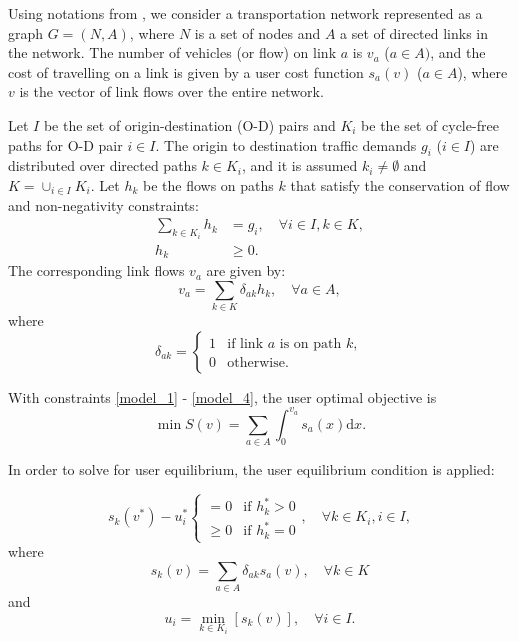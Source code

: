 
Using notations from \citet{Florian, Florian2008},
we consider a transportation network represented as a graph $G = (N, A)$,
where $N$ is a set of nodes and $A$ a set of directed links in the network.
The number of vehicles (or flow) on link $a$ is $v_a$ ($a \in A)$,
and the cost of travelling on a link is given by a user cost function $s_a(v)$ ($a \in A$),
where $v$ is the vector of link flows over the entire network.

Let $I$ be the set of origin-destination (O-D) pairs
and $K_i$ be the set of cycle-free paths for O-D pair $i \in I$.
The origin to destination traffic demands $g_i$ ($i \in I$) are distributed over directed paths $k \in K_i$,
and it is assumed $k_i \neq \emptyset$ and $K = \cup_{i \in I} K_i$.
Let $h_k$ be the flows on paths $k$ that satisfy the conservation of flow and non-negativity constraints:
\begin{align} \label{model_1}
    \sum_{k \in K_i} h_k & = g_i, \quad \forall i \in I, k \in K, \\
    h_k &\geq 0.
\end{align}
The corresponding link flows $v_a$ are given by:
\begin{equation}
    v_a = \sum_{k \in K} \delta_{ak} h_k, \quad \forall a \in A,
\end{equation}
where
\begin{equation} \label{model_4}
    \delta_{ak} = 
    \begin{cases}
        1 & \text{if link $a$ is on path $k$},\\
        0 & \text{otherwise}.
    \end{cases}
\end{equation}

With constraints \ref{model_1} - \ref{model_4},
the user optimal objective is
\begin{equation}
    \min S(v) = \sum_{a\in A} \int_0^{v_a} s_a(x) \mathrm{d} x.
\end{equation}

In order to solve for user equilibrium,
the \citep{Wardrop} user equilibrium condition is applied:

\begin{equation} \label{wardrop1}
    s_k(v^{\ast}) - u_i^{\ast} 
    \begin{cases}
        =0 & \text{if } h_k^{\ast} > 0 \\
        \geq 0 & \text{if } h_k^{\ast} = 0
    \end{cases}
    ,
    \quad \forall k \in K_i, i \in I,
\end{equation}
where 
\begin{equation}
    s_k(v) = \sum_{a \in A} \delta_{ak} s_a(v), \quad \forall k \in K
\end{equation}
and
\begin{equation} \label{wardrop3}
    u_i = \min_{k \in K_i} \left[ s_k(v) \right], \quad \forall i \in I.
\end{equation}

